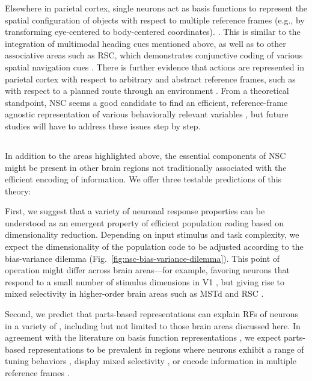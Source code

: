 Elsewhere in parietal cortex, single neurons act as basis functions 
to represent the spatial configuration of objects 
with respect to multiple reference frames
(e.g., by transforming eye-centered to body-centered coordinates).
\cite{Poggio1990,PougetSejnowski1997,PougetSnyder2000}.
This is similar to the integration of multimodal heading cues mentioned above,
as well as to other associative areas such as \ac{RSC},
which demonstrates conjunctive coding of various spatial navigation cues
\cite{AlexanderNitz2015,Rounds2018}.
There is further evidence that actions are represented in parietal cortex
with respect to arbitrary and abstract reference frames, 
such as with respect to a planned route through an environment \cite{nitz2009parietal}.
From a theoretical standpoint, \ac{NSC} seems a good candidate to find an efficient,
reference-frame agnostic representation of various behaviorally relevant variables
\cite{LouieGlimcher2012,louie2015adaptive,andersen1997multimodal,BenHamed2003},
but future studies will have to address these issues step by step.




\subsection*{}

In addition to the areas highlighted above, 
the essential components of \ac{NSC} might be present 
in other brain regions not traditionally associated 
with the efficient encoding of information.
We offer three testable predictions of this theory:

First, we suggest that a variety of neuronal response properties
can be understood as an emergent property of efficient population coding 
based on dimensionality reduction.
Depending on input stimulus and task complexity,
we expect the dimensionality of the population code to be adjusted
according to the bias-variance dilemma
(Fig.~\ref{fig:nsc-bias-variance-dilemma}).
This point of operation might differ across brain areas---for example,
favoring neurons that respond to a small number of stimulus dimensions
in \ac{V1} \cite{OlshausenField1996},
but giving rise to mixed selectivity in higher-order brain areas
such as \ac{MSTd} \cite{Beyeler2016} and
\ac{RSC} \cite{Rounds2016,Rounds2018}.

Second, we predict that parts-based representations can explain
\acp{RF} of neurons in a variety of ,
including but not limited to those brain areas discussed here. 
In agreement with the literature on basis function representations
\cite{PougetSejnowski1997,PougetSnyder2000,Poggio1990},
we expect parts-based representations
to be prevalent in regions where neurons
exhibit a range of tuning behaviors \cite{Beyeler2016},
display mixed selectivity \cite{Fusi2016,Eichenbaum2017},
or encode information in multiple reference frames 
\cite{AlexanderNitz2015,Rounds2016,Rounds2018}.

